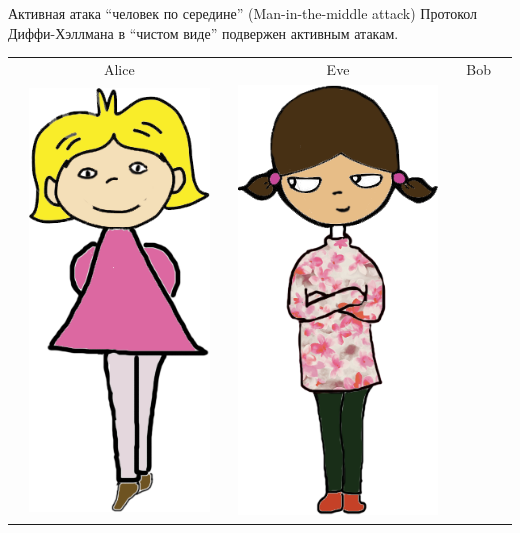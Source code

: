\documentclass[usenames,dvipsnames,8pt,aspectratio=169]{beamer}
\begin{document}
\begin{frame}{Активная атака ``человек по середине'' (Man-in-the-middle attack)}
\Large
Протокол Диффи-Хэллмана в ``чистом виде'' подвержен {\color{Orange} активным} атакам.


\large
\begin{center}
\begin{tabular}{l c c c c c l}
& Alice  & & Eve & & Bob &  \\
& \multirow{5}{*}{\includegraphics[scale=0.10]{Alice}} & & 
\multirow{5}{*}{\includegraphics[scale=0.10]{Eve}} & &

\end{tabular}
\end{center}
\end{frame}
\end{document}
